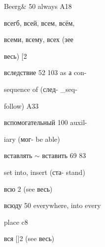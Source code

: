 \begin{minipage}[t]{0.475\textwidth}
\noindent Beerg\& 50 always A18\par
\noindent всегб, всей, всем, всём,\par
\noindent всеми, всему, всех (зее\par
\noindent весь) [2\par
\noindent вследствие 52 103 as а con-\par
\noindent sequence of (след- \_seq-\par
\noindent follow) A33\par
\noindent вспомогательный 100 auxil-\par
\noindent iary (мог- be able)\par
\noindent вставлять $\sim$ вставить 69 83\par
\noindent set into, insert (ста- stand)\par
\noindent всю 2 (see весь)\par
\noindent всюду 50 everywhere, into every\par
\noindent place c8\par
\noindent вся [|2 (see весь)\par
\end{minipage}\hfill

